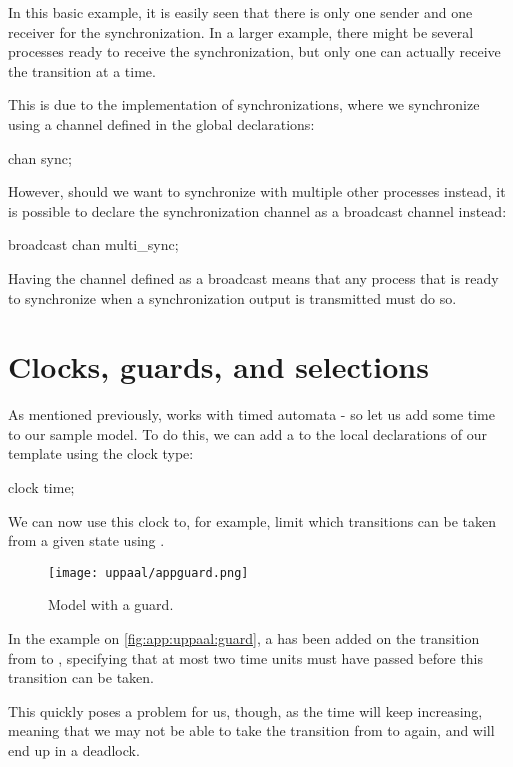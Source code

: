 In this basic example, it is easily seen that there is only one sender and one receiver for the synchronization.
In a larger example, there might be several processes ready to receive the synchronization, but only one can actually receive the transition at a time.

This is due to the implementation of synchronizations, where we synchronize using a channel defined in the global declarations:

\begin{uppaalcode}
chan sync;
\end{uppaalcode}
\noindent
However, should we want to synchronize with multiple other processes instead, it is possible to declare the synchronization channel as a broadcast channel instead:

\begin{uppaalcode}
broadcast chan multi_sync;
\end{uppaalcode}
\noindent
Having the channel defined as a broadcast means that any process that is ready to synchronize when a synchronization output is transmitted must do so.


\section*{Clocks, guards, and selections}
As mentioned previously, \uppaal works with timed automata - so let us add some time to our sample model.
To do this, we can add a  to the local declarations of our template using the clock type:
\begin{uppaalcode}
clock time;
\end{uppaalcode}
\noindent
We can now use this clock to, for example, limit which transitions can be taken from a given state using .

\begin{figure}[H]
    \centering
    \texttt{[image: uppaal/appguard.png]}
    \caption{Model with a guard.}
    \label{fig:app:uppaal:guard}
\end{figure}
\noindent
In the example on \autoref{fig:app:uppaal:guard}, a  has been added on the transition from  to , specifying that at most two time units must have passed before this transition can be taken.

This quickly poses a problem for us, though, as the time will keep increasing, meaning that we may not be able to take the transition from  to  again, and will end up in a deadlock.

